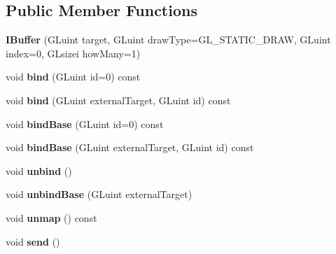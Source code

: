 \subsection*{Public Member Functions}
\begin{DoxyCompactItemize}
\item 
\mbox{\label{classflw_1_1flc_1_1IBuffer_ad7053cc22011388104c4bcc6ca05599e}} 
{\bfseries I\+Buffer} (G\+Luint target, G\+Luint draw\+Type=G\+L\+\_\+\+S\+T\+A\+T\+I\+C\+\_\+\+D\+R\+AW, G\+Luint index=0, G\+Lsizei how\+Many=1)
\item 
\mbox{\label{classflw_1_1flc_1_1IBuffer_a514ccb174518186c1f8575d354a88ce1}} 
void {\bfseries bind} (G\+Luint id=0) const
\item 
\mbox{\label{classflw_1_1flc_1_1IBuffer_a7c9febcfd0e06742b7593533bbcda793}} 
void {\bfseries bind} (G\+Luint external\+Target, G\+Luint id) const
\item 
\mbox{\label{classflw_1_1flc_1_1IBuffer_aade93aaaa4805313fa1c774f2c94a5f3}} 
void {\bfseries bind\+Base} (G\+Luint id=0) const
\item 
\mbox{\label{classflw_1_1flc_1_1IBuffer_ad14e42719b8e10d3cb4b01ec1ab3d433}} 
void {\bfseries bind\+Base} (G\+Luint external\+Target, G\+Luint id) const
\item 
\mbox{\label{classflw_1_1flc_1_1IBuffer_aa838099c22a2799d4cad641f8d40e674}} 
void {\bfseries unbind} ()
\item 
\mbox{\label{classflw_1_1flc_1_1IBuffer_a1321b63bca1153b09b914f9ca8d52b2a}} 
void {\bfseries unbind\+Base} (G\+Luint external\+Target)
\item 
\mbox{\label{classflw_1_1flc_1_1IBuffer_a5c3e63c40164850818e94fe74ef194f9}} 
void {\bfseries unmap} () const
\item 
\mbox{\label{classflw_1_1flc_1_1IBuffer_a0fa4b45e543ed7f945f8d216628e7c53}} 
void {\bfseries send} ()
\item 

\end{DoxyCompactItemize}
